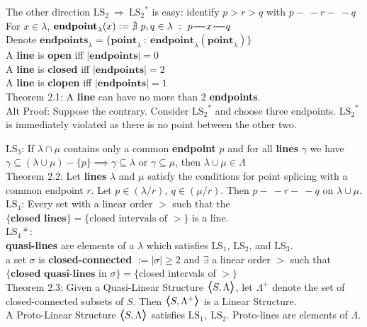 \documentclass{article}
\newcommand{\hsp}[1][5]{\hspace{0.#1 cm}}
\newcommand{\hcm}[1][1]{\hspace{#1 cm}}
\newcommand{\bra}[1][1.2]{\scalebox{#1}{$\boldsymbol{\langle}$}}
\newcommand{\nl}[1][12]{\\[#1pt]}
\newcommand{\ket}[1][1.2]{\scalebox{#1}{$\boldsymbol{\rangle}$}}
\newcommand{\imp}{\ \Rightarrow\ }
\newcommand{\st}{\ : \ }
\newcommand{\defeq}{\vcentcolon=}
\newcommand{\ch}[1]{\text{#1}}
\newcommand {\chb}[1]{\textbf{#1}}
\newcommand{\seg}{\!-\!\!\!\!\:-}
\begin{document}
\begin{flushleft}
\hcm The other direction $\ch{LS}_2 \imp {\ch{LS}_2}^*$ is easy: identify $p>r>q$ with $p\seg r\seg q$\nl[12]

\hsp[2] For $x \in \lambda$, $\chb{endpoint}_\lambda(x) \defeq \nexists\ p,q \in \lambda \st p\seg x \seg q$\\
\hsp[2] Denote $\chb{endpoints}_\lambda = \{\chb{point}_\lambda \st \chb{endpoint}_\lambda(\chb{point}_\lambda)\}$\\[6pt]\hsp[2]
A \chb{line} is \chb{open} iff $|\chb{endpoints}|=0$\\\hsp[2]
A \chb{line} is \chb{closed} iff $|\chb{endpoints}|=2$\\\hsp[2]
A \chb{line} is \chb{clopen} iff $|\chb{endpoints}|=1$\nl\hsp[2]
Theorem 2.1: A \chb{line} can have no more than 2 \chb{endpoints}.\\\hcm
{\color{purple}
	Alt Proof: Suppose the contrary. Consider ${\ch{LS}_2}^*$ and choose three endpoints. ${\ch{LS}_2}^*$ is immediately violated as there is no point between the other two.\nl[10]
}

$\ch{LS}_3$: If $\lambda \cap \mu$ contains only a common \chb{endpoint} $p$ and for all \chb{lines} $\gamma$ we have {\color{purple} $\gamma \subseteq (\lambda \cup \mu) - \{p\} \implies \gamma \subseteq \lambda$ or $\gamma \subseteq \mu$}, then $\lambda \cup \mu \in \Lambda$\nl[10]

\hsp[2] Theorem 2.2: Let \chb{lines} $\lambda$ and $\mu$ satisfy the conditions for point splicing with a common endpoint $r$. Let $p \in (\lambda/r),\ q\in (\mu/r)$. Then $p\seg r \seg q$ on $\lambda\cup \mu$.\nl[10]

$\ch{LS}_4$: Every set with a linear order $>$ such that the $\{\chb{closed lines}\} = \{\ch{closed intervals of }>\}$ is a line.\nl[5]
{\color{purple}
	${\ch{LS}_4}*$:\nl[10]
}
\chb{quasi-lines} are elements of a $\lambda$ which satisfies $\ch{LS}_1$, $\ch{LS}_2$, and $\ch{LS}_3$.\nl[2]
a set $\sigma$ is \chb{closed-connected} $ := |\sigma| \geq 2 $ and $\exists$ a linear order $>$ such that \\\hcm$\{\chb{closed quasi-lines}$ in $\sigma\} = \{$closed intervals of $>\}$\nl[10]

Theorem 2.3: Given a Quasi-Linear Structure $\bra S, \Lambda\ket$, let $\Lambda^+$ denote the set of closed-connected subsets of $S$. Then $\bra S, \Lambda^+\ket $ is a Linear Structure.\nl[10]

A Proto-Linear Structure $\bra S, \Lambda\ket$ satisfies $\ch{LS}_1,\ \ch{LS}_2$. Proto-lines are elements of $\Lambda$.\nl[10]


\end{flushleft}
\end{document}
